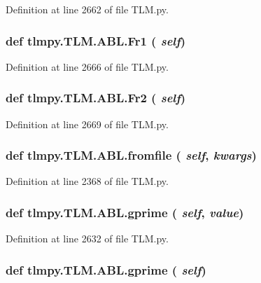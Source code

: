 Definition at line 2662 of file TLM.py.\hypertarget{classtlmpy_1_1TLM_1_1ABL_aa9e515fedf7e342f623ab9da063f39c7}{
\subsubsection[{Fr1}]{\setlength{\rightskip}{0pt plus 5cm}def tlmpy.TLM.ABL.Fr1 ( {\em self})}}
\label{classtlmpy_1_1TLM_1_1ABL_aa9e515fedf7e342f623ab9da063f39c7}


Definition at line 2666 of file TLM.py.\hypertarget{classtlmpy_1_1TLM_1_1ABL_ad8e1be8faa2dc3d8d7bd77e04b9a57bb}{
\subsubsection[{Fr2}]{\setlength{\rightskip}{0pt plus 5cm}def tlmpy.TLM.ABL.Fr2 ( {\em self})}}
\label{classtlmpy_1_1TLM_1_1ABL_ad8e1be8faa2dc3d8d7bd77e04b9a57bb}


Definition at line 2669 of file TLM.py.\hypertarget{classtlmpy_1_1TLM_1_1ABL_a5fb3ebdd56b8906b2708a7bf0b058445}{
\subsubsection[{fromfile}]{\setlength{\rightskip}{0pt plus 5cm}def tlmpy.TLM.ABL.fromfile ( {\em self}, \/   {\em kwargs})}}
\label{classtlmpy_1_1TLM_1_1ABL_a5fb3ebdd56b8906b2708a7bf0b058445}


Definition at line 2368 of file TLM.py.\hypertarget{classtlmpy_1_1TLM_1_1ABL_ad67e3f83321c99876246b7d19d5fa303}{
\subsubsection[{gprime}]{\setlength{\rightskip}{0pt plus 5cm}def tlmpy.TLM.ABL.gprime ( {\em self}, \/   {\em value})}}
\label{classtlmpy_1_1TLM_1_1ABL_ad67e3f83321c99876246b7d19d5fa303}


Definition at line 2632 of file TLM.py.\hypertarget{classtlmpy_1_1TLM_1_1ABL_ad67e3f83321c99876246b7d19d5fa303}{
\subsubsection[{gprime}]{\setlength{\rightskip}{0pt plus 5cm}def tlmpy.TLM.ABL.gprime ( {\em self})}}
\label{classtlmpy_1_1TLM_1_1ABL_ad67e3f83321c99876246b7d19d5fa303}


